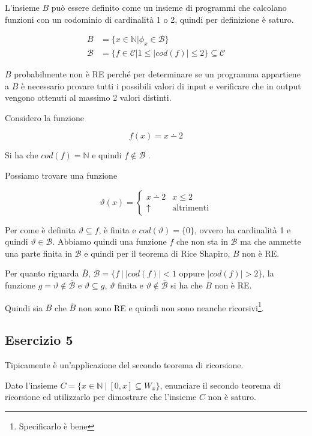 L'insieme $B$ può essere definito come un insieme di programmi che calcolano funzioni con un codominio di cardinalità 1 o 2, quindi per definizione è saturo.

\begin{align*}
	B &= \{ x \in \mathbb{N} | \phi_x \in \mathcal{B} \} \\
	\mathcal{B} &= \{ f \in \mathcal{C} | 1 \leq |cod(f) | \leq 2 \} \subseteq \mathcal{C}
\end{align*}

$B$ probabilmente non è RE perché per determinare se un programma appartiene a $B$ è necessario provare tutti i possibili valori di input e verificare che in output vengono ottenuti al massimo 2 valori distinti.

Considero la funzione 

$$
f(x) = x \dotminus 2
$$

Si ha che $cod(f) = \mathbb{N}$ e quindi $f \notin \mathcal{B}$ .

Possiamo trovare una funzione

$$
\vartheta(x) = \begin{cases}
	x \dotminus 2 &x \leq 2 \\
	\uparrow &\text{altrimenti}
\end{cases}
$$

Per come è definita $\vartheta \subseteq f$, è finita e $cod(\vartheta) = \{0\}$, ovvero ha cardinalità 1 e quindi $\vartheta \in \mathcal{B}$. Abbiamo quindi una funzione $f$ che non sta in $\mathcal{B}$ ma che ammette una parte finita in $\mathcal{B}$ e quindi per il teorema di Rice Shapiro, $B$ non è RE.

Per quanto riguarda $\overline{B}$, $\overline{\mathcal{B}} = \{ f \:|\: |cod(f)| < 1 \text{ oppure } |cod(f)| > 2 \}$, la funzione $g = \vartheta \notin \overline{\mathcal{B}}$ e $\vartheta \subseteq g$, $\vartheta$ finita e $\vartheta \notin \overline{\mathcal{B}}$ si ha che $\overline{B}$ non è RE.

Quindi sia $B$ che $\overline{B}$ non sono RE e quindi non sono neanche ricorsivi\footnote{Specificarlo è bene}.

\subsection{Esercizio 5}

Tipicamente è un'applicazione del secondo teorema di ricorsione.

Dato l'insieme $C = \{ x \in \mathbb{N} \: | \: [0,x] \subseteq W_x \} $, enunciare il secondo teorema di ricorsione ed utilizzarlo per dimostrare che l'insieme $C$ non è saturo.

